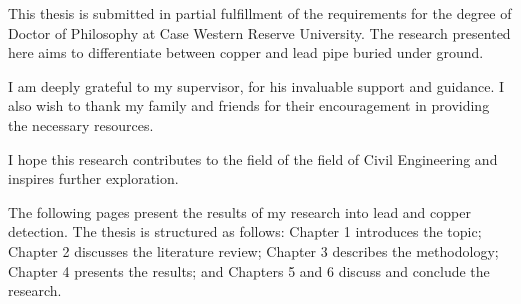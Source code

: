 \noindent
This thesis is submitted in partial fulfillment of the requirements for the degree of Doctor of Philosophy at Case Western Reserve University. The research presented here aims to differentiate between copper and lead pipe buried under ground.

I am deeply grateful to my supervisor, for his invaluable support and guidance. I also wish to thank my family and friends for their encouragement in providing the necessary resources.

I hope this research contributes to the field of the field of Civil Engineering and inspires further exploration.

The following pages present the results of my research into lead and copper detection. The thesis is structured as follows: Chapter 1 introduces the topic; Chapter 2 discusses the literature review; Chapter 3 describes the methodology; Chapter 4 presents the results; and Chapters 5 and 6 discuss and conclude the research.


